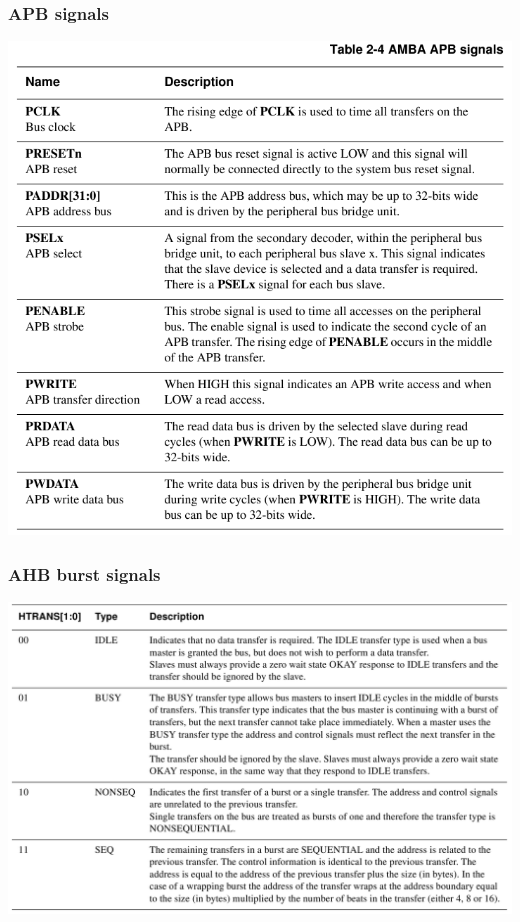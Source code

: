 \documentclass[a4paper]{scrartcl}
\begin{document}
        \subsubsection*{APB signals}
        \centering\includegraphics[scale=0.6]{amba4}
        \subsubsection*{AHB burst signals}
        \centering\includegraphics[scale=0.4]{amba6}
\end{document}
